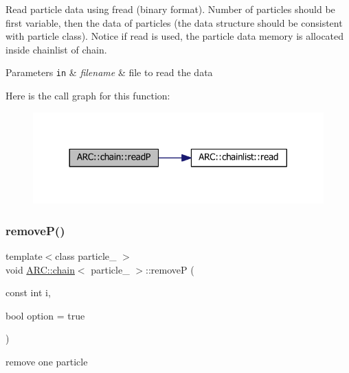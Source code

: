 Read particle data using fread (binary format). Number of particles should be first variable, then the data of particles (the data structure should be consistent with particle class). Notice if read is used, the particle data memory is allocated inside chainlist of chain. 
\begin{DoxyParams}[1]{Parameters}
\mbox{\tt in}  & {\em filename} & file to read the data \\
\hline
\end{DoxyParams}
Here is the call graph for this function\+:
\nopagebreak
\begin{figure}[H]
\begin{center}
\leavevmode
\includegraphics[width=317pt]{classARC_1_1chain_a5325cc6945e9992b431450f7846e91e5_cgraph}
\end{center}
\end{figure}
\hypertarget{classARC_1_1chain_a8ba21a4be849607692d73e846802a287}{}\label{classARC_1_1chain_a8ba21a4be849607692d73e846802a287} 
\subsubsection{\texorpdfstring{remove\+P()}{removeP()}}
{\footnotesize\ttfamily template$<$class particle\+\_\+ $>$ \\
void \hyperlink{classARC_1_1chain}{A\+R\+C\+::chain}$<$ particle\+\_\+ $>$\+::removeP (\begin{DoxyParamCaption}\item[{const int}]{i,  }\item[{bool}]{option = {\ttfamily true} }\end{DoxyParamCaption})\hspace{0.3cm}{\ttfamily [inline]}}



remove one particle 

